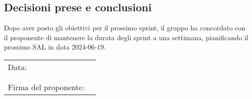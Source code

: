 \documentclass[italian,12pt]{article}
\begin{document}
\subsection{Decisioni prese e conclusioni}
Dopo aver posto gli obiettivi per il prossimo sprint, il gruppo ha concordato con il proponente di mantenere la durata
degli sprint a una settimana, pianificando il prossimo SAL in data 2024-06-19.


\newpage
\begin{table}[b]
	\begin{tabular}{@{}p{5cm}p{10cm}@{}}
		Data:                 & \hrulefill \\
		                      &            \\
		                      &            \\
		Firma del proponente: & \hrulefill \\
	\end{tabular}
\end{table}
\end{document}
